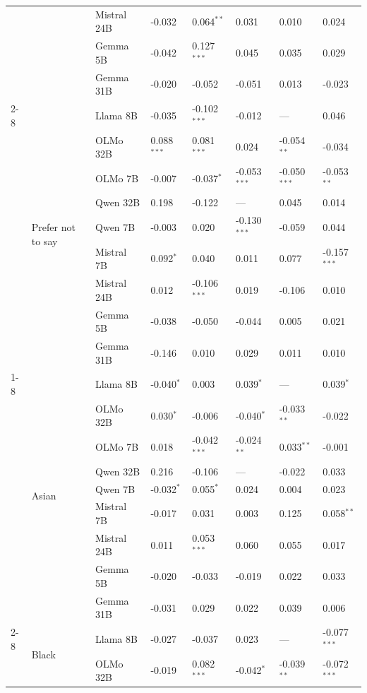 \begin{longtable}[t]{llllllll}
 &  & Mistral 24B & -0.032 & 0.064$^{**}$ & 0.031 & 0.010 & 0.024 \\
 &  & Gemma 5B & -0.042 & 0.127$^{***}$ & 0.045 & 0.035 & 0.029 \\
 &  & Gemma 31B & -0.020 & -0.052 & -0.051 & 0.013 & -0.023 \\
\cline{2-8}
 & \multirow[t]{9}{*}{Prefer not to say} & Llama 8B & -0.035 & -0.102$^{***}$ & -0.012 & --- & 0.046 \\
 &  & OLMo 32B & 0.088$^{***}$ & 0.081$^{***}$ & 0.024 & -0.054$^{**}$ & -0.034 \\
 &  & OLMo 7B & -0.007 & -0.037$^{*}$ & -0.053$^{***}$ & -0.050$^{***}$ & -0.053$^{**}$ \\
 &  & Qwen 32B & 0.198 & -0.122 & --- & 0.045 & 0.014 \\
 &  & Qwen 7B & -0.003 & 0.020 & -0.130$^{***}$ & -0.059 & 0.044 \\
 &  & Mistral 7B & 0.092$^{*}$ & 0.040 & 0.011 & 0.077 & -0.157$^{***}$ \\
 &  & Mistral 24B & 0.012 & -0.106$^{***}$ & 0.019 & -0.106 & 0.010 \\
 &  & Gemma 5B & -0.038 & -0.050 & -0.044 & 0.005 & 0.021 \\
 &  & Gemma 31B & -0.146 & 0.010 & 0.029 & 0.011 & 0.010 \\
\cline{1-8} \cline{2-8}
\multirow[t]{63}{*}{Ethnicity} & \multirow[t]{9}{*}{Asian} & Llama 8B & -0.040$^{*}$ & 0.003 & 0.039$^{*}$ & --- & 0.039$^{*}$ \\
 &  & OLMo 32B & 0.030$^{*}$ & -0.006 & -0.040$^{*}$ & -0.033$^{**}$ & -0.022 \\
 &  & OLMo 7B & 0.018 & -0.042$^{***}$ & -0.024$^{**}$ & 0.033$^{**}$ & -0.001 \\
 &  & Qwen 32B & 0.216 & -0.106 & --- & -0.022 & 0.033 \\
 &  & Qwen 7B & -0.032$^{*}$ & 0.055$^{*}$ & 0.024 & 0.004 & 0.023 \\
 &  & Mistral 7B & -0.017 & 0.031 & 0.003 & 0.125 & 0.058$^{**}$ \\
 &  & Mistral 24B & 0.011 & 0.053$^{***}$ & 0.060 & 0.055 & 0.017 \\
 &  & Gemma 5B & -0.020 & -0.033 & -0.019 & 0.022 & 0.033 \\
 &  & Gemma 31B & -0.031 & 0.029 & 0.022 & 0.039 & 0.006 \\
\cline{2-8}
 & \multirow[t]{9}{*}{Black} & Llama 8B & -0.027 & -0.037 & 0.023 & --- & -0.077$^{***}$ \\
 &  & OLMo 32B & -0.019 & 0.082$^{***}$ & -0.042$^{*}$ & -0.039$^{**}$ & -0.072$^{***}$ \\

\end{longtable}
